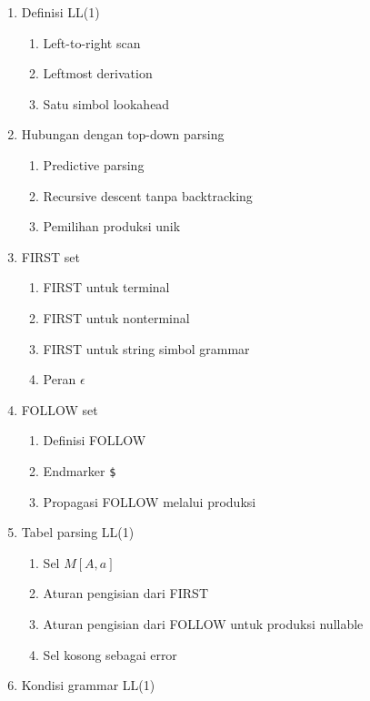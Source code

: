 \begin{enumerate}
    \item \pwajib Definisi LL(1)
    \begin{enumerate}
        \item \pwajib Left-to-right scan
        \item \pwajib Leftmost derivation
        \item \pwajib Satu simbol lookahead
    \end{enumerate}
    \item \pwajib Hubungan dengan top-down parsing
    \begin{enumerate}
        \item \pwajib Predictive parsing
        \item \pwajib Recursive descent tanpa backtracking
        \item \pwajib Pemilihan produksi unik
    \end{enumerate}
    \item \pwajib FIRST set
    \begin{enumerate}
        \item \pwajib FIRST untuk terminal
        \item \pwajib FIRST untuk nonterminal
        \item \pwajib FIRST untuk string simbol grammar
        \item \pwajib Peran $\epsilon$
    \end{enumerate}
    \item \pwajib FOLLOW set
    \begin{enumerate}
        \item \pwajib Definisi FOLLOW
        \item \pwajib Endmarker \texttt{\$}
        \item \pwajib Propagasi FOLLOW melalui produksi
    \end{enumerate}
    \item \pwajib Tabel parsing LL(1)
    \begin{enumerate}
        \item \pwajib Sel $M[A,a]$
        \item \pwajib Aturan pengisian dari FIRST
        \item \pwajib Aturan pengisian dari FOLLOW untuk produksi nullable
        \item \pwajib Sel kosong sebagai error
    \end{enumerate}
    \item \pwajib Kondisi grammar LL(1)

\end{enumerate}
